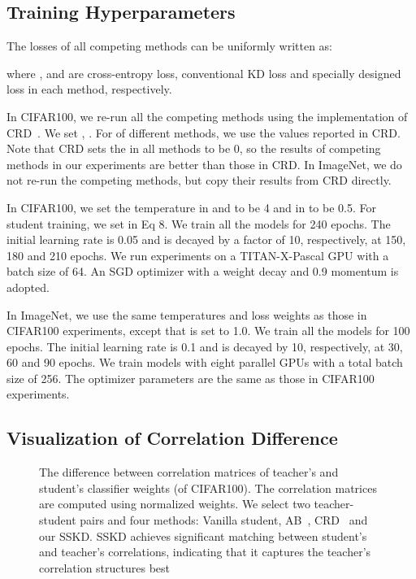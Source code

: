 \documentclass[runningheads]{llncs}
\begin{document}
\subsection{Training Hyperparameters}

The losses of all competing methods can be uniformly written as:

where ,  and  are cross-entropy loss, conventional KD loss and specially designed loss in each method, respectively. 

In CIFAR100, we re-run all the competing methods using the implementation of CRD~\cite{crd}. We set , . For  of different methods, we use the values reported in CRD. Note that CRD sets the  in all methods to be 0, so the results of competing methods in our experiments are better than those in CRD. 
In ImageNet, we do not re-run the competing methods, but copy their results from CRD directly.

In CIFAR100, we set the temperature  in  and  to be 4 and  in  to be 0.5. 
For student training, we set  in Eq 8. 
We train all the models for 240 epochs. The initial learning rate is 0.05 and is decayed by a factor of 10, respectively, at 150, 180 and 210 epochs.
We run experiments on a TITAN-X-Pascal GPU with a batch size of 64. An SGD optimizer with a  weight decay and 0.9 momentum is adopted. 

\vspace{0.2cm}
In ImageNet, we use the same temperatures and loss weights as those in CIFAR100 experiments, except that  is set to 1.0. We train all the models for 100 epochs. The initial learning rate is 0.1 and is decayed by 10, respectively, at 30, 60 and 90 epochs. We train models with eight parallel GPUs with a total batch size of 256. The optimizer parameters are the same as those in CIFAR100 experiments.


\subsection{Visualization of Correlation Difference}

\begin{figure}[t]
    \centering
    \caption{The difference between correlation matrices of teacher's and student's classifier weights (of CIFAR100). The correlation matrices are computed using normalized weights. We select two teacher-student pairs and four methods: Vanilla student, AB~\cite{AB}, CRD~\cite{crd} and our SSKD. SSKD achieves significant matching between student's and teacher's correlations, indicating that it captures the teacher's correlation structures best}
    \label{fig:1}
\end{figure}
\end{document}
